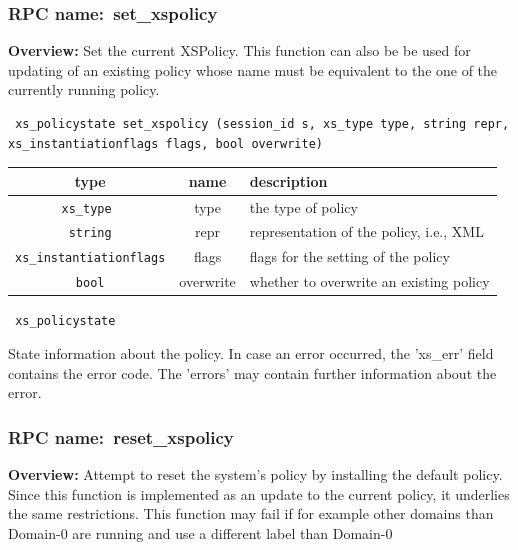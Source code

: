 \subsubsection{RPC name:~set\_xspolicy}

{\bf Overview:}
Set the current XSPolicy. This function can also be be used for updating of
an existing policy whose name must be equivalent to the one of the
currently running policy.

\begin{verbatim} xs_policystate set_xspolicy (session_id s, xs_type type, string repr,
xs_instantiationflags flags, bool overwrite)\end{verbatim}


\vspace{0.3cm}

\begin{tabular}{|c|c|p{7cm}|}
 \hline
{\bf type} & {\bf name} & {\bf description} \\ \hline
{\tt xs\_type } & type & the type of policy \\ \hline
{\tt string} & repr & representation of the policy, i.e., XML \\ \hline
{\tt xs\_instantiationflags}    & flags & flags for the setting of the policy \\ \hline
{\tt bool}   & overwrite & whether to overwrite an existing policy \\ \hline

\end{tabular}

\vspace{0.3cm}


{\tt
xs\_policystate
}


State information about the policy. In case an error occurred, the 'xs\_err'
field contains the error code. The 'errors' may contain further information
about the error.
 \vspace{0.3cm}
\vspace{0.3cm}
\vspace{0.3cm}
\subsubsection{RPC name:~reset\_xspolicy}

{\bf Overview:}
Attempt to reset the system's policy by installing the default policy.
Since this function is implemented as an update to the current policy, it
underlies the same restrictions. This function may fail if for example
other domains than Domain-0 are running and use a different label than
Domain-0

